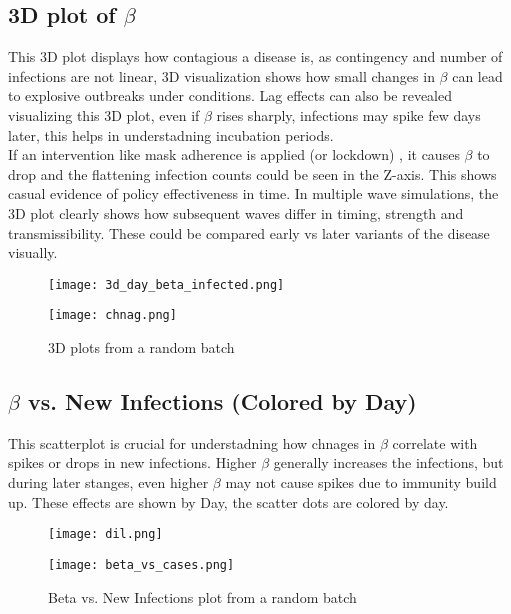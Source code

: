 \documentclass[11pt,a4paper]{article}
\theoremstyle{remark}\newtheorem{remark}{Remark}
\begin{document}
\subsection{3D plot of  \times $\beta$ \times {}}
This 3D plot displays how contagious a disease is, as contingency and number of infections are not linear, 3D visualization shows how small changes in $\beta$ can lead to explosive outbreaks under conditions. Lag effects can also be revealed visualizing this 3D plot, even if $\beta$ rises sharply, infections may spike few days later, this helps in understadning incubation periods. \\
If an intervention like mask adherence is applied (or lockdown) , it causes $\beta$ to drop and the flattening infection counts could be seen in the Z-axis. This shows casual evidence of policy effectiveness in time. In multiple wave simulations, the 3D plot clearly shows how subsequent waves differ in timing, strength and transmissibility. These could be compared early vs later variants of the disease visually. 
\begin{figure}[H]
    \begin{minipage}{0.49\linewidth}
        \flushleft
        \texttt{[image: 3d\_day\_beta\_infected.png]}
    \end{minipage}
    \hfill
    \begin{minipage}{0.49\linewidth}
        \flushright
        \texttt{[image: chnag.png]}
    \end{minipage}
    
    \caption{3D plots from a random batch}
    \label{fig:seir-side-by-side}
\end{figure}
\subsection{$\beta$ vs. New Infections (Colored by Day)}
This scatterplot is crucial for understadning how chnages in $\beta$ correlate with spikes or drops in new infections. Higher $\beta$ generally increases the infections, but during later stanges, even higher $\beta$ may not cause spikes due to immunity build up. These effects are shown by Day, the scatter dots are colored by day.
\begin{figure}[H]
    \begin{minipage}{0.49\linewidth}
        \flushleft
        \texttt{[image: dil.png]}
    \end{minipage}
    \hfill
    \begin{minipage}{0.49\linewidth}
        \flushright
        \texttt{[image: beta\_vs\_cases.png]}
    \end{minipage}
    
    \caption{Beta vs. New Infections plot from a random batch}
    \label{fig:seir-side-by-side}
\end{figure}
\end{document}
